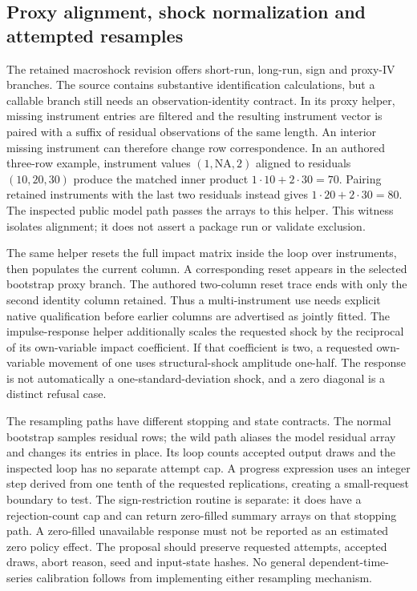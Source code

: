 \subsection{Proxy alignment, shock normalization and attempted resamples}

The retained macroshock revision offers short-run, long-run, sign and proxy-IV branches. The source contains substantive identification calculations, but a callable branch still needs an observation-identity contract. In its proxy helper, missing instrument entries are filtered and the resulting instrument vector is paired with a suffix of residual observations of the same length. An interior missing instrument can therefore change row correspondence. In an authored three-row example, instrument values $(1,\mathrm{NA},2)$ aligned to residuals $(10,20,30)$ produce the matched inner product $1\cdot10+2\cdot30=70$. Pairing retained instruments with the last two residuals instead gives $1\cdot20+2\cdot30=80$. The inspected public model path passes the arrays to this helper. This witness isolates alignment; it does not assert a package run or validate exclusion.~\citep{exec25_pydyn_macroshock,exec25_pydyn_choice}

The same helper resets the full impact matrix inside the loop over instruments, then populates the current column. A corresponding reset appears in the selected bootstrap proxy branch. The authored two-column reset trace ends with only the second identity column retained. Thus a multi-instrument use needs explicit native qualification before earlier columns are advertised as jointly fitted. The impulse-response helper additionally scales the requested shock by the reciprocal of its own-variable impact coefficient. If that coefficient is two, a requested own-variable movement of one uses structural-shock amplitude one-half. The response is not automatically a one-standard-deviation shock, and a zero diagonal is a distinct refusal case.~\citep{exec25_pydyn_macroshock,exec25_pydyn_choice}

The resampling paths have different stopping and state contracts. The normal bootstrap samples residual rows; the wild path aliases the model residual array and changes its entries in place. Its loop counts accepted output draws and the inspected loop has no separate attempt cap. A progress expression uses an integer step derived from one tenth of the requested replications, creating a small-request boundary to test. The sign-restriction routine is separate: it does have a rejection-count cap and can return zero-filled summary arrays on that stopping path. A zero-filled unavailable response must not be reported as an estimated zero policy effect. The proposal should preserve requested attempts, accepted draws, abort reason, seed and input-state hashes. No general dependent-time-series calibration follows from implementing either resampling mechanism.~\citep{exec25_pydyn_macroshock}

